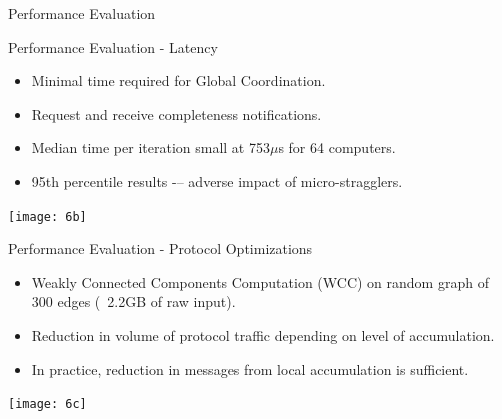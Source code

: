 \begin{frame}[t]{Performance Evaluation}
  \vspace{0.15cm}

\end{frame}

\begin{frame}[t]{Performance Evaluation - Latency}
  \vspace{0.15cm}

  \begin{itemize}
    \setlength\itemsep{0.15cm}
    \item Minimal time required for Global Coordination.
    \item Request and receive completeness notifications.
    \item Median time per iteration small at 753$\mu$s for 64 computers.
    \item 95th percentile results -– adverse impact of micro-stragglers.
  \end{itemize}

  \vspace{0.15cm}
  \begin{center}
    \texttt{[image: 6b]}
  \end{center}
\end{frame}

\begin{frame}[t]{Performance Evaluation - Protocol Optimizations}
  \vspace{0.15cm}

  \begin{itemize}
    \setlength\itemsep{0.15cm}
    \item Weakly Connected Components Computation (WCC) on random graph of 300 edges (~2.2GB of raw input).
    \item Reduction in volume of protocol traffic depending on level of accumulation.
    \item In practice, reduction in messages from local accumulation is sufficient.
  \end{itemize}

  \vspace{0.15cm}
  \begin{center}
    \texttt{[image: 6c]}
  \end{center}
\end{frame}

